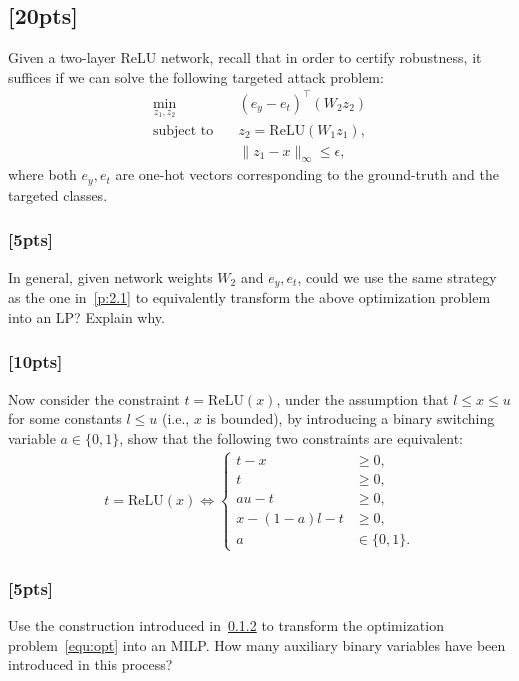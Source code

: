 \documentclass[letterpaper,11pt]{article}
\theoremstyle{definition}
\begin{document}
\subsection{[20pts]}
Given a two-layer ReLU network, recall that in order to certify robustness, it suffices if we can solve the following targeted attack problem:
\begin{align}
    \min_{z_1, z_2} &\quad (e_y - e_t)^\top (W_2 z_2) \nonumber\\
    \text{subject to} &\quad z_2 = \mathrm{ReLU}(W_1z_1), \nonumber\\
                      &\quad \|z_1 - x\|_\infty \leq \epsilon,
\label{equ:opt}
\end{align}
where both $e_y, e_t$ are one-hot vectors corresponding to the ground-truth and the targeted classes. 

\subsubsection{[5pts]}
In general, given network weights $W_2$ and $e_y, e_t$, could we use the same strategy as the one in~\ref{p:2.1} to equivalently transform the above optimization problem into an LP? Explain why.

\subsubsection{[10pts]}
\label{p:2.2.1}
Now consider the constraint $t = \mathrm{ReLU}(x)$, under the assumption that $l \leq x \leq u$ for some constants $l \leq u$ (i.e., $x$ is bounded), by introducing a binary switching variable $a\in\{0, 1\}$, show that the following two constraints are equivalent:
\begin{align*}
    t = \mathrm{ReLU}(x) \Longleftrightarrow 
\begin{cases}
    t -x &\geq 0,\\
    t & \geq 0, \\
    au - t &\geq 0, \\
    x - (1-a)l - t &\geq 0, \\
    a & \in \{0, 1\}.
\end{cases} 
\end{align*}

\subsubsection{[5pts]}
Use the construction introduced in~\ref{p:2.2.1} to transform the optimization problem~\eqref{equ:opt} into an MILP. How many auxiliary binary variables have been introduced in this process?
\end{document}
